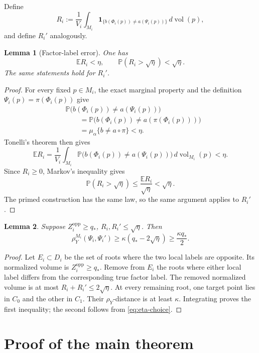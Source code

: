 \documentclass[12pt]{amsart}
\newtheorem{lemma}[lemma]{Lemma}
\theoremstyle{definition}
\newcommand{\vol}{\operatorname{vol}}
\newcommand{\1}{\mathbf 1}
\newcommand{\dd}{\,d}
\begin{document}
Define
\[
 R_i:=\frac1{V_i}\int_{M_i}
 \1_{\{b(\Phi_i(p))\neq a(\Psi_i(p))\}}
 \dd\vol(p),
\]
and define $R_i'$ analogously.

\begin{lemma}[Factor-label error]\label{lem:Ri}
One has
\[
 \mathbb E R_i<\eta,
 \qquad
 \mathbb P(R_i>\sqrt\eta)<\sqrt\eta.
\]
The same statements hold for $R_i'$.
\end{lemma}

\begin{proof}
For every fixed $p\in M_i$, the exact marginal property and the definition $\Psi_i(p)=\pi(\Phi_i(p))$ give
\begin{align*}
 &\mathbb P\bigl(b(\Phi_i(p))\neq a(\Psi_i(p))\bigr)\\
 &\qquad=\mathbb P\bigl(b(\Phi_i(p))\neq a(\pi(\Phi_i(p)))\bigr)\\
 &\qquad=\mu_\alpha\{b\neq a\circ\pi\}<\eta.
\end{align*}
Tonelli's theorem then gives
\[
 \mathbb E R_i
 =\frac1{V_i}\int_{M_i}
 \mathbb P\bigl(b(\Phi_i(p))\neq a(\Psi_i(p))\bigr)
 \,d\vol_{M_i}(p)<\eta.
\]
Since $R_i\geq0$, Markov's inequality gives
\[
 \mathbb P(R_i>\sqrt\eta)
 \leq\frac{\mathbb E R_i}{\sqrt\eta}<\sqrt\eta.
\]
The primed construction has the same law, so the same argument applies to $R_i'$.
\end{proof}

\begin{lemma}\label{lem:metric-label}
Suppose
$ Z_i^\mathrm{opp}\geq q_*$,
 $R_i,R_i'\leq\sqrt\eta$.
Then
\begin{equation}\label{eq:metric-separation}
 \rho_Y^{M_i}(\Psi_i,\Psi_i')\geq
 \kappa(q_*-2\sqrt\eta)\geq\frac{\kappa q_*}{2}.
\end{equation}
\end{lemma}

\begin{proof}
Let $E_i\subset D_i$ be the set of roots where the two local labels are opposite. Its normalized volume is $Z_i^\mathrm{opp}\geq q_*$. Remove from $E_i$ the roots where either local label differs from the corresponding true factor label. The removed normalized volume is at most $R_i+R_i'\leq2\sqrt\eta$. At every remaining root, one target point lies in $C_0$ and the other in $C_1$. Their $\rho_Y$-distance is at least $\kappa$. Integrating proves the first inequality; the second follows from \eqref{eq:eta-choice}.
\end{proof}

\section{Proof of the main theorem}
\end{document}
